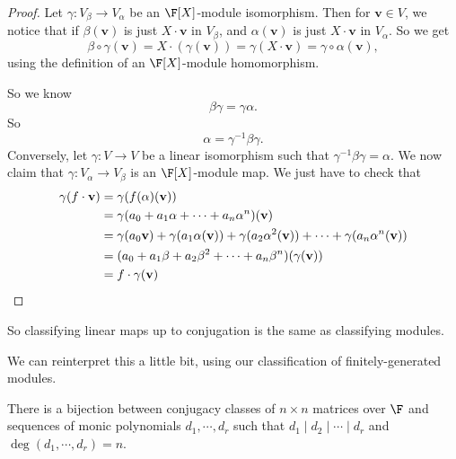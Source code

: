 \documentclass[a4paper]{article}
\begin{document}
\begin{proof}
  Let $\gamma: V_\beta \to V_\alpha$ be an $\F[X]$-module isomorphism. Then for $\mathbf{v} \in V$, we notice that if $\beta (\mathbf{v})$ is just $X \cdot \mathbf{v}$ in $V_\beta$, and $\alpha(\mathbf{v})$ is just $X \cdot \mathbf{v}$ in $V_\alpha$. So we get
  \[
    \beta \circ \gamma(\mathbf{v}) = X \cdot (\gamma(\mathbf{v})) = \gamma(X \cdot \mathbf{v}) = \gamma \circ \alpha(\mathbf{v}),
  \]
  using the definition of an $\F[X]$-module homomorphism.

  So we know
  \[
    \beta\gamma = \gamma\alpha.
  \]
  So
  \[
    \alpha = \gamma^{-1}\beta\gamma.
  \]
  Conversely, let $\gamma: V \to V$ be a linear isomorphism such that $\gamma^{-1}\beta\gamma = \alpha$. We now claim that $\gamma: V_\alpha \to V_\beta$ is an $\F[X]$-module map. We just have to check that
  \begin{align*}
    \gamma(f \cdot \mathbf{v}) &= \gamma(f(\alpha)(\mathbf{v})) \\
    &= \gamma(a_0 + a_1 \alpha + \cdots + a_n \alpha^n) (\mathbf{v})\\
    &= \gamma(a_0 \mathbf{v}) + \gamma(a_1 \alpha(\mathbf{v})) + \gamma (a_2 \alpha^2 (\mathbf{v})) + \cdots + \gamma(a_n \alpha^n(\mathbf{v}))\\
    &= (a_0 + a_1 \beta + a_2 \beta^2 + \cdots + a_n \beta^n)(\gamma(\mathbf{v}))\\
    &= f\cdot \gamma(\mathbf{v}) \qedhere
  \end{align*}
\end{proof}
So classifying linear maps up to conjugation is the same as classifying modules.

We can reinterpret this a little bit, using our classification of finitely-generated modules.
\begin{cor}
  There is a bijection between conjugacy classes of $n \times n$ matrices over $\F$ and sequences of monic polynomials $d_1, \cdots, d_r$ such that $d_1 \mid d_2 \mid \cdots \mid d_r$ and $\deg (d_1,\cdots, d_r) = n$.
\end{cor}
\end{document}
